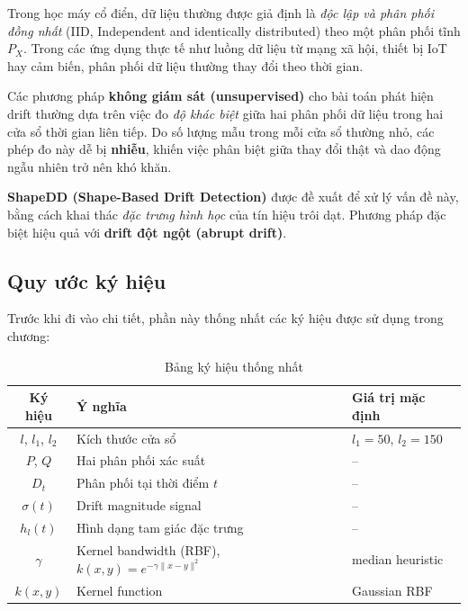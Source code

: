 Trong học máy cổ điển, dữ liệu thường được giả định là \textit{độc lập và phân phối đồng nhất} (IID, Independent and identically distributed) theo một phân phối tĩnh $P_X$. Trong các ứng dụng thực tế như luồng dữ liệu từ mạng xã hội, thiết bị IoT hay cảm biến, phân phối dữ liệu thường thay đổi theo thời gian.

Các phương pháp \textbf{không giám sát (unsupervised)} cho bài toán phát hiện drift thường dựa trên việc đo \textit{độ khác biệt} giữa hai phân phối dữ liệu trong hai cửa sổ thời gian liên tiếp. Do số lượng mẫu trong mỗi cửa sổ thường nhỏ, các phép đo này dễ bị \textbf{nhiễu}, khiến việc phân biệt giữa thay đổi thật và dao động ngẫu nhiên trở nên khó khăn.

\textbf{ShapeDD (Shape-Based Drift Detection)} được đề xuất để xử lý vấn đề này, bằng cách khai thác \textit{đặc trưng hình học} của tín hiệu trôi dạt. Phương pháp đặc biệt hiệu quả với \textbf{drift đột ngột (abrupt drift)}.

\subsection{Quy ước ký hiệu}

Trước khi đi vào chi tiết, phần này thống nhất các ký hiệu được sử dụng trong chương:

\begin{table}[H]
	\centering
	\caption{Bảng ký hiệu thống nhất}
	\label{tab:notation}
	\begin{tabular}{|c|l|l|}
		\hline
		\textbf{Ký hiệu}  & \textbf{Ý nghĩa}             & \textbf{Giá trị mặc định} \\
		\hline
		$l$, $l_1$, $l_2$ & Kích thước cửa sổ            & $l_1=50$, $l_2=150$       \\
		$P$, $Q$          & Hai phân phối xác suất       & --                        \\
		$D_t$             & Phân phối tại thời điểm $t$  & --                        \\
		$\sigma(t)$       & Drift magnitude signal       & --                        \\
		$h_l(t)$          & Hình dạng tam giác đặc trưng & --                        \\
		$\gamma$        & Kernel bandwidth (RBF), $k(x,y) = e^{-\gamma\|x-y\|^2}$ & median heuristic          \\
		$k(x,y)$          & Kernel function              & Gaussian RBF              \\
		\hline
	\end{tabular}
\end{table}

